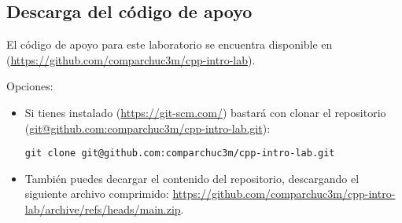 \subsection{Descarga del código de apoyo}

El código de apoyo para este laboratorio se encuentra disponible en
 (\url{https://github.com/comparchuc3m/cpp-intro-lab}).

Opciones:

\begin{itemize}

\item Si tienes instalado  (\url{https://git-scm.com/}) bastará
con clonar el repositorio (\url{git@github.com:comparchuc3m/cpp-intro-lab.git}):

\begin{lstlisting}[style=terminal]
git clone git@github.com:comparchuc3m/cpp-intro-lab.git
\end{lstlisting}

\item También puedes decargar el contenido del repositorio, descargando el
siguiente archivo comprimido: 
\url{https://github.com/comparchuc3m/cpp-intro-lab/archive/refs/heads/main.zip}.

\end{itemize}

